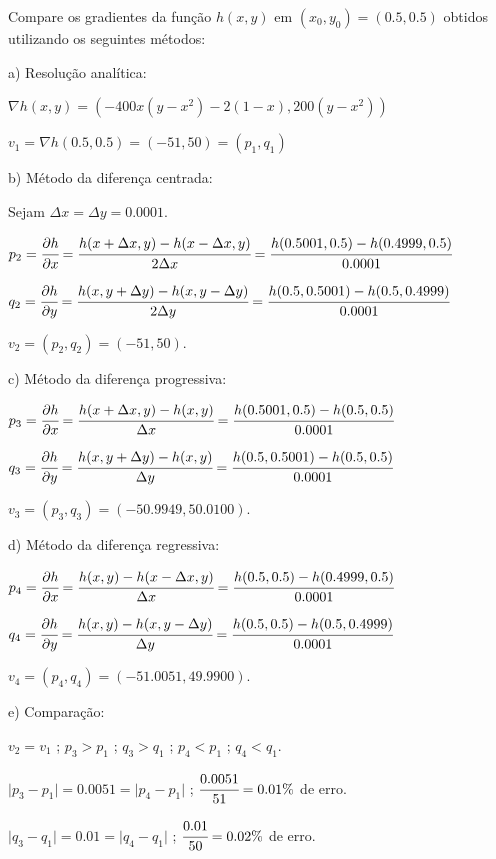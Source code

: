 \documentclass{rbfin}
\begin{document}
\doublespacing

Compare os gradientes da função $h(x, y)$ em $(x_0, y_0) = (0.5, 0.5)$ obtidos utilizando os seguintes métodos:

a) Resolução analítica:

$\nabla h(x,y) = (-400x(y - x^2) - 2(1 - x), 200(y - x^2))$

$v_1 = \nabla h(0.5, 0.5) = (-51,50) = (p_1, q_1)$

b) Método da diferença centrada:

Sejam $\Delta x = \Delta y = 0.0001$.

$p_2 = \cfrac{\partial h}{\partial x} = \cfrac{h(x + \Delta x,y) - h(x - \Delta x,y)}{2\Delta x} = \cfrac{h(0.5001,0.5) - h(0.4999,0.5)}{0.0001}$

$q_2 = \cfrac{\partial h}{\partial y} = \cfrac{h(x,y + \Delta y) - h(x,y - \Delta y)}{2\Delta y} = \cfrac{h(0.5,0.5001) - h(0.5,0.4999)}{0.0001}$

$v_2 = (p_2, q_2) = (-51,50)$.

c) Método da diferença progressiva:

$p_3 = \cfrac{\partial h}{\partial x} = \cfrac{h(x + \Delta x,y) - h(x,y)}{\Delta x} = \cfrac{h(0.5001,0.5) - h(0.5,0.5)}{0.0001}$

$q_3 = \cfrac{\partial h}{\partial y} = \cfrac{h(x,y + \Delta y) - h(x,y)}{\Delta y} = \cfrac{h(0.5,0.5001) - h(0.5,0.5)}{0.0001}$

$v_3 = (p_3, q_3) = (-50.9949, 50.0100)$.

d) Método da diferença regressiva:

$p_4 = \cfrac{\partial h}{\partial x} = \cfrac{h(x,y) - h(x - \Delta x,y)}{\Delta x} = \cfrac{h(0.5,0.5) - h(0.4999,0.5)}{0.0001}$

$q_4 = \cfrac{\partial h}{\partial y} = \cfrac{h(x,y) - h(x,y - \Delta y)}{\Delta y} = \cfrac{h(0.5,0.5) - h(0.5,0.4999)}{0.0001}$

$v_4 = (p_4, q_4) = (-51.0051, 49.9900)$.

e) Comparação:

$v_2 = v_1$ ; $p_3 > p_1$ ; $q_3 > q_1$ ; $p_4 < p_1$ ; $q_4 < q_1$.

$\vert p_3 - p_1 \vert = 0.0051 = \vert p_4 - p_1 \vert$ ; $\cfrac{0.0051}{51} = 0.01\%$ de erro.

$\vert q_3 - q_1 \vert = 0.01 = \vert q_4 - q_1 \vert$ ; $\cfrac{0.01}{50} = 0.02\%$ de erro.

\singlespacing

\vspace{6mm}
\end{document}
